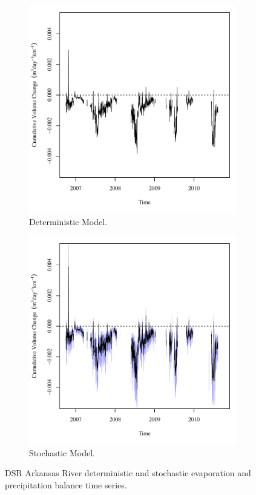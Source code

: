 \begin{linenumbers}
\begin{figure}[htbp]
\centering
	\begin{subfigure}{0.5\textwidth}
		\centering
		\includegraphics[width=0.9\linewidth]{"Figures/Results_DDSR/Balance Water - atm"}
		\caption{Deterministic Model.}
		\label{sub:DSRWaterAtmD}
	\end{subfigure}%
	\begin{subfigure}{0.5\textwidth}
		\centering
		\includegraphics[width=0.9\linewidth]{"Figures/Results_DSR/Balance Water - atm"}
		\caption{Stochastic Model.}
		\label{sub:DSRWaterAtmS}
	\end{subfigure}
		\caption[DSR Arkansas River deterministic and stochastic evaporation and precipitation balance time series.]{DSR Arkansas River deterministic and stochastic evaporation and precipitation balance time series.}
	\label{fig:DSRWaterAtm}
\end{figure}


\end{linenumbers}
